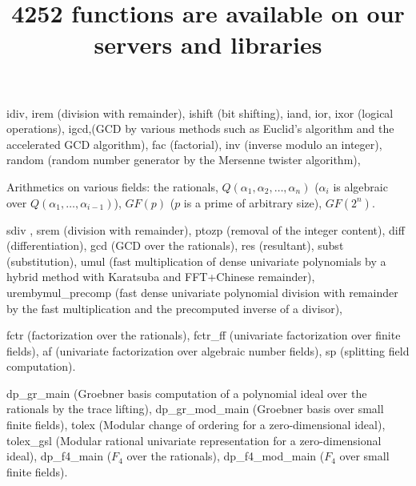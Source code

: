 \documentclass[twocolumn]{article}
\title{\huge \color{blue} 4252 functions are available
on our servers and libraries}
\author{} \date{}
\begin{document}
\maketitle

\noindent
{}

\noindent
{\color{red} idiv},{\color{red} irem} (division with remainder),
{\color{red} ishift} (bit shifting),
{\color{red} iand},{\color{red} ior},{\color{red} ixor} (logical operations),
{\color{red} igcd},(GCD by various methods such as Euclid's algorithm and
the accelerated GCD algorithm),
{\color{red} fac} (factorial),
{\color{red} inv} (inverse modulo an integer),
{\color{red} random} (random number generator by the Mersenne twister algorithm),



\medbreak

\noindent
{}

\noindent
Arithmetics on various fields: the rationals, 
$Q(\alpha_1,\alpha_2,\ldots,\alpha_n)$
($\alpha_i$ is algebraic over $Q(\alpha_1,\ldots,\alpha_{i-1})$),
$GF(p)$ ($p$ is a prime of arbitrary size), $GF(2^n)$.

\medbreak

\noindent
{}

\noindent
{\color{red} sdiv }, {\color{red} srem } (division with remainder),
{\color{red} ptozp } (removal of the integer content),
{\color{red} diff } (differentiation),
{\color{red} gcd } (GCD over the rationals),
{\color{red} res } (resultant),
{\color{red} subst } (substitution),
{\color{red} umul} (fast multiplication of dense univariate polynomials 
by a hybrid method with Karatsuba and FFT+Chinese remainder),
{\color{red} urembymul\_precomp} (fast dense univariate polynomial 
division with remainder by the fast multiplication and 
the precomputed inverse of a divisor),

\noindent
{}
{\color{red} fctr } (factorization over the rationals),
{\color{red} fctr\_ff } (univariate factorization over finite fields),
{\color{red} af } (univariate factorization over algebraic number fields),
{\color{red} sp} (splitting field computation).

\medbreak

\noindent
{} 

\noindent
{\color{red} dp\_gr\_main } (Groebner basis computation of a polynomial ideal 
over the rationals by the trace lifting),
{\color{red} dp\_gr\_mod\_main } (Groebner basis over small finite fields),
{\color{red} tolex } (Modular change of ordering for a zero-dimensional ideal),
{\color{red} tolex\_gsl } (Modular rational univariate representation 
for a zero-dimensional ideal),
{\color{red} dp\_f4\_main } ($F_4$ over the rationals),
{\color{red} dp\_f4\_mod\_main } ($F_4$ over small finite fields).
\end{document}
